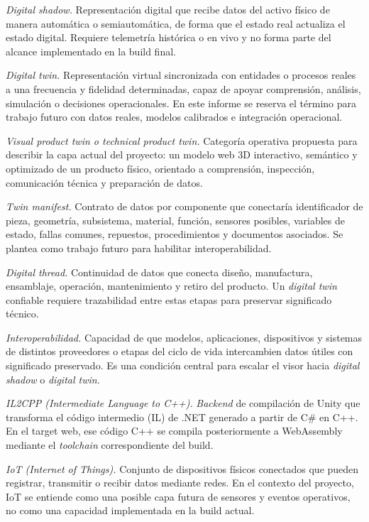 \textit{Digital shadow.} Representación digital que recibe datos del activo físico de manera automática o semiautomática, de forma que el estado real actualiza el estado digital. Requiere telemetría histórica o en vivo y no forma parte del alcance implementado en la build final.

\textit{Digital twin.} Representación virtual sincronizada con entidades o procesos reales a una frecuencia y fidelidad determinadas, capaz de apoyar comprensión, análisis, simulación o decisiones operacionales. En este informe se reserva el término para trabajo futuro con datos reales, modelos calibrados e integración operacional.

\textit{Visual product twin o technical product twin.} Categoría operativa propuesta para describir la capa actual del proyecto: un modelo web 3D interactivo, semántico y optimizado de un producto físico, orientado a comprensión, inspección, comunicación técnica y preparación de datos.

\textit{Twin manifest.} Contrato de datos por componente que conectaría identificador de pieza, geometría, subsistema, material, función, sensores posibles, variables de estado, fallas comunes, repuestos, procedimientos y documentos asociados. Se plantea como trabajo futuro para habilitar interoperabilidad.

\textit{Digital thread.} Continuidad de datos que conecta diseño, manufactura, ensamblaje, operación, mantenimiento y retiro del producto. Un \textit{digital twin} confiable requiere trazabilidad entre estas etapas para preservar significado técnico.

\textit{Interoperabilidad.} Capacidad de que modelos, aplicaciones, dispositivos y sistemas de distintos proveedores o etapas del ciclo de vida intercambien datos útiles con significado preservado. Es una condición central para escalar el visor hacia \textit{digital shadow} o \textit{digital twin}.

\textit{IL2CPP (\textit{Intermediate Language to C++}).} \textit{Backend} de compilación de Unity que transforma el código intermedio (IL) de .NET generado a partir de C\# en C++. En el target web, ese código C++ se compila posteriormente a WebAssembly mediante el \textit{toolchain} correspondiente del build.

\textit{IoT (\textit{Internet of Things}).} Conjunto de dispositivos físicos conectados que pueden registrar, transmitir o recibir datos mediante redes. En el contexto del proyecto, IoT se entiende como una posible capa futura de sensores y eventos operativos, no como una capacidad implementada en la build actual.

